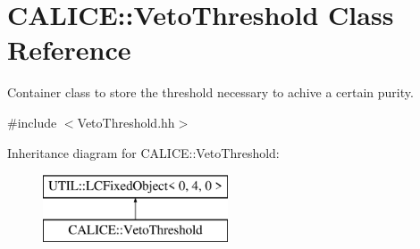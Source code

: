\section{C\-A\-L\-I\-C\-E\-:\-:Veto\-Threshold Class Reference}
\label{classCALICE_1_1VetoThreshold}


Container class to store the threshold necessary to achive a certain purity.  




{\ttfamily \#include $<$Veto\-Threshold.\-hh$>$}

Inheritance diagram for C\-A\-L\-I\-C\-E\-:\-:Veto\-Threshold\-:\begin{figure}[H]
\begin{center}
\leavevmode
\includegraphics[height=2.000000cm]{classCALICE_1_1VetoThreshold}
\end{center}
\end{figure}
